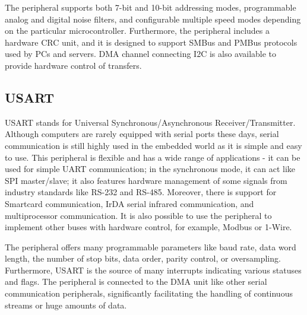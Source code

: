 The peripheral supports both 7-bit and 10-bit addressing modes, programmable analog and digital noise filters, and configurable multiple speed modes depending on the particular microcontroller. Furthermore, the peripheral includes a hardware CRC unit, and it is designed to support SMBus and PMBus protocols used by PCs and servers. DMA channel connecting I2C is also available to provide hardware control of transfers.

	\subsection{USART}
	\label{sub:usart}
USART stands for Universal Synchronous/Asynchronous Receiver/Transmitter. Although computers are rarely equipped with serial ports these days, serial communication is still highly used in the embedded world as it is simple and easy to use. This peripheral is flexible and has a wide range of applications - it can be used for simple UART communication; in the synchronous mode, it can act like SPI master/slave; it also features hardware management of some signals from industry standards like RS-232 and RS-485. Moreover, there is support for Smartcard communication, IrDA serial infrared communication, and multiprocessor communication. It is also possible to use the peripheral to implement other buses with hardware control, for example, Modbus or 1-Wire.  

The peripheral offers many programmable parameters like baud rate, data word length, the number of stop bits, data order, parity control, or oversampling. Furthermore, USART is the source of many interrupts indicating various statuses and flags. The peripheral is connected to the DMA unit like other serial communication peripherals, significantly facilitating the handling of continuous streams or huge amounts of data.